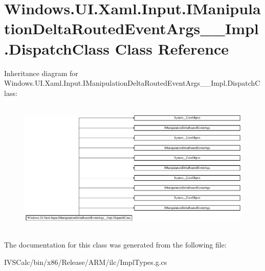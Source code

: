 \hypertarget{class_windows_1_1_u_i_1_1_xaml_1_1_input_1_1_i_manipulation_delta_routed_event_args_____impl_1_1_dispatch_class}{}\section{Windows.\+U\+I.\+Xaml.\+Input.\+I\+Manipulation\+Delta\+Routed\+Event\+Args\+\_\+\+\_\+\+Impl.\+Dispatch\+Class Class Reference}
\label{class_windows_1_1_u_i_1_1_xaml_1_1_input_1_1_i_manipulation_delta_routed_event_args_____impl_1_1_dispatch_class}
Inheritance diagram for Windows.\+U\+I.\+Xaml.\+Input.\+I\+Manipulation\+Delta\+Routed\+Event\+Args\+\_\+\+\_\+\+Impl.\+Dispatch\+Class\+:\begin{figure}[H]
\begin{center}
\leavevmode
\includegraphics[height=6.497890cm]{class_windows_1_1_u_i_1_1_xaml_1_1_input_1_1_i_manipulation_delta_routed_event_args_____impl_1_1_dispatch_class}
\end{center}
\end{figure}


The documentation for this class was generated from the following file\+:\begin{DoxyCompactItemize}
\item 
I\+V\+S\+Calc/bin/x86/\+Release/\+A\+R\+M/ilc/Impl\+Types.\+g.\+cs\end{DoxyCompactItemize}
